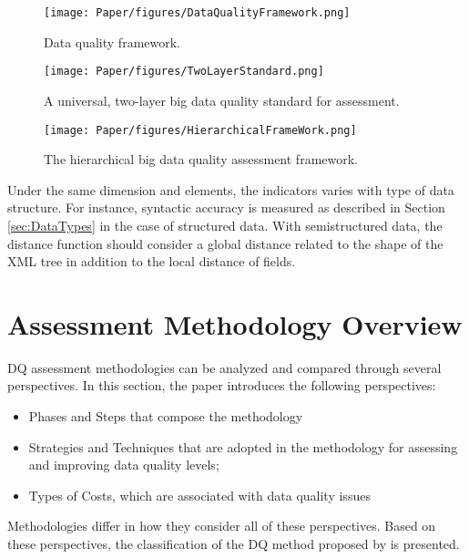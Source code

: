 \documentclass[pdftex,english,oribibl]{llncs}
\begin{document}
  \begin{figure}
    \centering
    \texttt{[image: Paper/figures/DataQualityFramework.png]}
    \caption{Data quality framework. \cite{Cai2005ChallnegesOfDataQuality}}
    \label{fig:dataqualityframework}
  \end{figure}

  \begin{figure}
    \centering
    \texttt{[image: Paper/figures/TwoLayerStandard.png]}
    \caption{A universal, two-layer big data quality standard for assessment. \cite{Cai2005ChallnegesOfDataQuality}}
    \label{fig:twolayerstandard}
  \end{figure}

\begin{figure}
    \centering
    \texttt{[image: Paper/figures/HierarchicalFrameWork.png]}
    \caption{The hierarchical big data quality assessment framework. \cite{Cai2005ChallnegesOfDataQuality}}
    \label{fig:hierachicalframwork}
 \end{figure}
Under the same dimension and elements, the indicators varies with type of data structure.
 For instance, syntactic accuracy is measured as described in Section \ref{sec:DataTypes} in the case of structured data. With semistructured data, the distance function should consider a global distance related to the shape of the XML tree in addition to the local distance of fields.

\section{Assessment Methodology Overview}
DQ assessment methodologies can be analyzed and compared through several perspectives.  In this section, the paper introduces the following perspectives:
\begin{itemize}
    \item Phases and Steps that compose the methodology
    \item Strategies and Techniques that are adopted in the methodology for assessing and  improving data quality levels;
    \item Types of Costs, which are associated with data quality issues
\end{itemize}

Methodologies differ in how they consider all of these perspectives. Based on these perspectives, the classification of the DQ method proposed by \citet{Batini2009MethodologiesForDataQuality} is presented.
\end{document}
